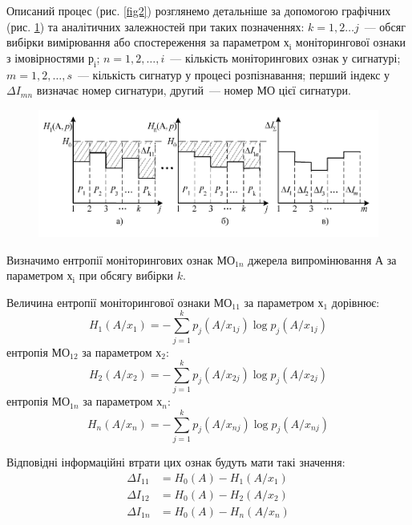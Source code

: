 Описаний процес (рис. \ref{fig2}) розглянемо детальніше за допомогою графічних (рис. \ref{fig3}) та аналітичних залежностей при таких позначеннях: $k = 1, 2 \ldots j$~--- обсяг вибірки вимірювання або спостереження за параметром $х_і$ моніторингової ознаки з імовірностями $р_і$; $n = 1, 2, \ldots, i$~--- кількість моніторингових ознак у сигнатурі; $m= 1, 2, \ldots, s$~--- кількість сигнатур у процесі розпізнавання; перший індекс у $\Delta I_{mn}$  визначає номер сигнатури, другий~--- номер МО цієї сигнатури.


\begin{figure}\centering
	\includegraphics[width=0.8\linewidth]{fig3}
	
\label{fig3}
\end{figure}




Визначимо ентропії моніторингових ознак $МО_{1n}$ джерела випромінювання $А$ за параметром $х_і$ при обсягу вибірки $k$.

Величина ентропії моніторингової ознаки $МО_{11}$ за параметром $х_1$ дорівнює:
\begin{equation}\label{radap1354eq10}
H_1(A/x_1) = -\sum\limits_{j=1}^{k} p_j(A/x_{1j})\log p_j(A/x_{1j})
\end{equation}
ентропія $МО_{12}$ за параметром $х_2$: 
\begin{equation}\label{radap1354eq11}
H_2(A/x_2) = -\sum\limits_{j=1}^{k} p_j(A/x_{2j})\log p_j(A/x_{2j})
\end{equation}
ентропія $МО_{1n}$ за параметром $х_n$: 
\begin{equation}\label{radap1354eq12}
H_n(A/x_n) = -\sum\limits_{j=1}^{k} p_j(A/x_{nj})\log p_j(A/x_{nj})
\end{equation}

Відповідні інформаційні втрати цих ознак будуть мати такі значення:
\begin{equation}
\begin{aligned}\label{radap1354eq13}
\Delta I_{11} &= H_0(A)-H_1(A/x_1)\\ 
\Delta I_{12} &= H_0(A)-H_2(A/x_2)\\ 
\Delta I_{1n} &= H_0(A)-H_n(A/x_n)
\end{aligned}
\end{equation}

